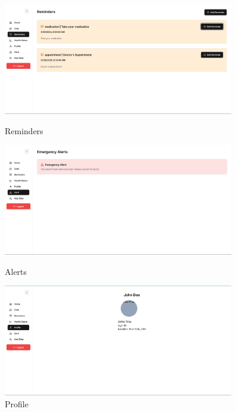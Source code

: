 \begin{figure}
    \centering
    \begin{minipage}{\textwidth}
        \centering
        \includegraphics[width=0.9\textwidth]{reminders.png}
        \caption{Reminders\\}
        \label{fig:reminders}
    \end{minipage}
    \vspace{5pt}
    \begin{minipage}{\textwidth}
        \centering
        \includegraphics[width=0.9\textwidth]{alert.png}
        \caption{Alerts}
        \label{fig:alerts}
    \end{minipage}
    \vspace{5pt}
    \begin{minipage}{\textwidth}
        \centering
        \includegraphics[width=0.9\textwidth]{profile.png}
        \caption{Profile}
        \label{fig:profile}
    \end{minipage}
    \vspace{5pt}
\end{figure}

